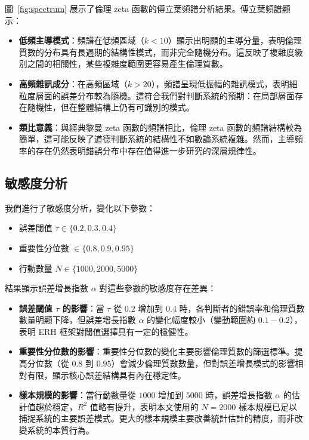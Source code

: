\documentclass[12pt,a4paper]{article}
\theoremstyle{definition}
\theoremstyle{remark}
\begin{document}
圖~\ref{fig:spectrum} 展示了倫理 zeta 函數的傅立葉頻譜分析結果。傅立葉頻譜顯示：
\begin{itemize}
    \item \textbf{低頻主導模式}：頻譜在低頻區域（$k < 10$）顯示出明顯的主導分量，表明倫理質數的分布具有長週期的結構性模式，而非完全隨機分布。這反映了複雜度級別之間的相關性，某些複雜度範圍更容易產生倫理質數。
    \item \textbf{高頻雜訊成分}：在高頻區域（$k > 20$），頻譜呈現低振幅的雜訊模式，表明細粒度層面的誤差分布較為隨機。這符合我們對判斷系統的預期：在局部層面存在隨機性，但在整體結構上仍有可識別的模式。
    \item \textbf{類比意義}：與經典黎曼 zeta 函數的頻譜相比，倫理 zeta 函數的頻譜結構較為簡單，這可能反映了道德判斷系統的結構性不如數論系統複雜。然而，主導頻率的存在仍然表明錯誤分布中存在值得進一步研究的深層規律性。
\end{itemize}

\subsection{敏感度分析}

我們進行了敏感度分析，變化以下參數：
\begin{itemize}
    \item 誤差閾值 $\tau \in \{0.2, 0.3, 0.4\}$
    \item 重要性分位數 $\in \{0.8, 0.9, 0.95\}$
    \item 行動數量 $N \in \{1000, 2000, 5000\}$
\end{itemize}

結果顯示誤差增長指數 $\alpha$ 對這些參數的敏感度存在差異：
\begin{itemize}
    \item \textbf{誤差閾值 $\tau$ 的影響}：當 $\tau$ 從 $0.2$ 增加到 $0.4$ 時，各判斷者的錯誤率和倫理質數數量明顯下降，但誤差增長指數 $\alpha$ 的變化幅度較小（變動範圍約 $0.1-0.2$），表明 ERH 框架對閾值選擇具有一定的穩健性。
    \item \textbf{重要性分位數的影響}：重要性分位數的變化主要影響倫理質數的篩選標準。提高分位數（從 $0.8$ 到 $0.95$）會減少倫理質數數量，但對誤差增長模式的影響相對有限，顯示核心誤差結構具有內在穩定性。
    \item \textbf{樣本規模的影響}：當行動數量從 $1000$ 增加到 $5000$ 時，誤差增長指數 $\alpha$ 的估計值趨於穩定，$R^2$ 值略有提升，表明本文使用的 $N=2000$ 樣本規模已足以捕捉系統的主要誤差模式。更大的樣本規模主要改善統計估計的精度，而非改變系統的本質行為。
\end{itemize}
\end{document}
